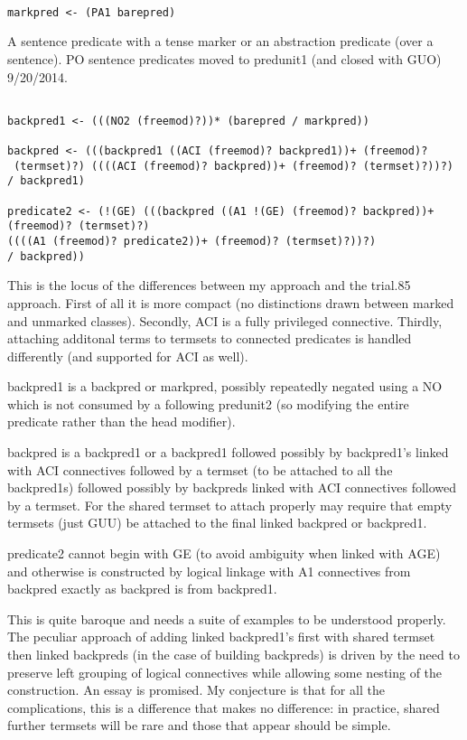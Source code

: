 \documentclass[12pt]{article}
\begin{document}
\begin{verbatim}

markpred <- (PA1 barepred) 

\end{verbatim}

A sentence predicate with a tense marker or an abstraction predicate (over a sentence).  PO sentence predicates moved to predunit1 (and closed with GUO) 9/20/2014.

\begin{verbatim}

backpred1 <- (((NO2 (freemod)?))* (barepred / markpred))

backpred <- (((backpred1 ((ACI (freemod)? backpred1))+ (freemod)?
 (termset)?) ((((ACI (freemod)? backpred))+ (freemod)? (termset)?))?) 
/ backpred1)

predicate2 <- (!(GE) (((backpred ((A1 !(GE) (freemod)? backpred))+ 
(freemod)? (termset)?) 
((((A1 (freemod)? predicate2))+ (freemod)? (termset)?))?) 
/ backpred))

\end{verbatim}

This is the locus of the differences between my approach and the trial.85 approach.  First of all it is more compact (no distinctions drawn between marked and unmarked classes).  Secondly, ACI is a fully privileged connective.   Thirdly, attaching additonal terms to termsets to connected predicates is handled differently (and supported for ACI as well).

backpred1 is a backpred or markpred, possibly repeatedly negated using a NO which is not consumed by a following predunit2 (so modifying the entire predicate rather than the head modifier).

backpred is a backpred1 or a backpred1 followed possibly  by backpred1's linked with ACI connectives followed by a termset
(to be attached to all the backpred1s) followed possibly by backpreds linked with ACI connectives followed by a termset.
For the shared termset to attach properly may require that empty termsets (just GUU) be attached to the final linked
backpred or backpred1.

predicate2 cannot begin with GE (to avoid ambiguity when linked with AGE) and otherwise is constructed by logical
linkage with A1 connectives from backpred exactly as backpred is from backpred1.

This is quite baroque and needs a suite of examples to be understood properly.  The  peculiar approach of adding
linked backpred1's first with shared termset then linked backpreds (in the case of building backpreds) is driven by
the need to preserve left grouping of logical connectives while allowing some nesting of the construction.  An essay is promised.  My conjecture is that for all the complications, this is a difference that makes no difference:  in practice, shared further termsets will be rare and those that appear should be simple.
\end{document}
